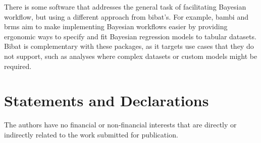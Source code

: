 \documentclass[sigconf, review]{acmart}
\begin{document}
There is some software that addresses the general task of facilitating
Bayesian workflow, but using a different approach from bibat's. For
example, bambi \citep{capretto2020} and brms
\citep{burknerBrmsPackageBayesian2017} aim to make implementing Bayesian
workflows easier by providing ergonomic ways to specify and fit Bayesian
regression models to tabular datasets. Bibat is complementary with these
packages, as it targets use cases that they do not support, such as
analyses where complex datasets or custom models might be required.

\section{Statements and Declarations}\label{statements-and-declarations}

The authors have no financial or non-financial interests that are
directly or indirectly related to the work submitted for publication.




\end{document}
